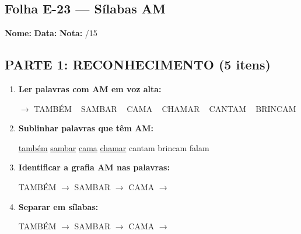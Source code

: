 \subsection{Folha E-23 --- Sílabas AM}
\begin{exercicio}



\noindent\textbf{Nome:} \underline{\hspace{3.2cm}} \quad \textbf{Data:} \underline{\hspace{1.6cm}} \quad \textbf{Nota:} \underline{\hspace{0.9cm}}/15


\subsection*{PARTE 1: RECONHECIMENTO (5 itens)}

\begin{enumerate}

  \item \textbf{Ler palavras com AM em voz alta:}
  \begin{center}
  $\rightarrow$ TAMBÉM ~ SAMBAR ~ CAMA ~ CHAMAR ~ CANTAM ~ BRINCAM
  \end{center}

  \item \textbf{Sublinhar palavras que têm AM:}

\begin{center}
  \uline{também} \quad \uline{sambar} \quad \uline{cama} \quad \uline{chamar} \quad cantam \quad brincam \quad falam
\end{center}

  \item \textbf{Identificar a grafia AM nas palavras:}
  \begin{center}
  TAMBÉM $\rightarrow$ \underline{\hspace{1cm}} \quad SAMBAR $\rightarrow$ \underline{\hspace{1cm}} \quad CAMA $\rightarrow$ \underline{\hspace{1cm}}
  \end{center}

  \item \textbf{Separar em sílabas:}
  \begin{center}
  TAMBÉM $\rightarrow$ \underline{\hspace{1.2cm}} \quad SAMBAR $\rightarrow$ \underline{\hspace{1.2cm}} \quad CAMA $\rightarrow$ \underline{\hspace{1.2cm}}
  \end{center}


\end{enumerate}
\end{exercicio}
